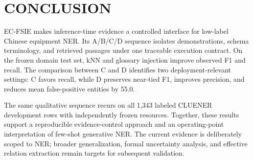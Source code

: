 \section{CONCLUSION}

EC-FSIE makes inference-time evidence a controlled interface for low-label
Chinese equipment NER. Its A/B/C/D sequence isolates demonstrations, schema
terminology, and retrieved passages under one traceable execution contract.
On the frozen domain test set, kNN and glossary injection improve observed F1
and recall. The comparison between C and D identifies two deployment-relevant
settings: C favors recall, while D preserves near-tied F1, improves precision,
and reduces mean false-positive entities by 55.0.

The same qualitative sequence recurs on all 1,343 labeled CLUENER development
rows with independently frozen resources. Together, these results support a
reproducible evidence-control approach and an operating-point interpretation of
few-shot generative NER. The current evidence is deliberately scoped to NER;
broader generalization, formal uncertainty analysis, and effective relation
extraction remain targets for subsequent validation.
